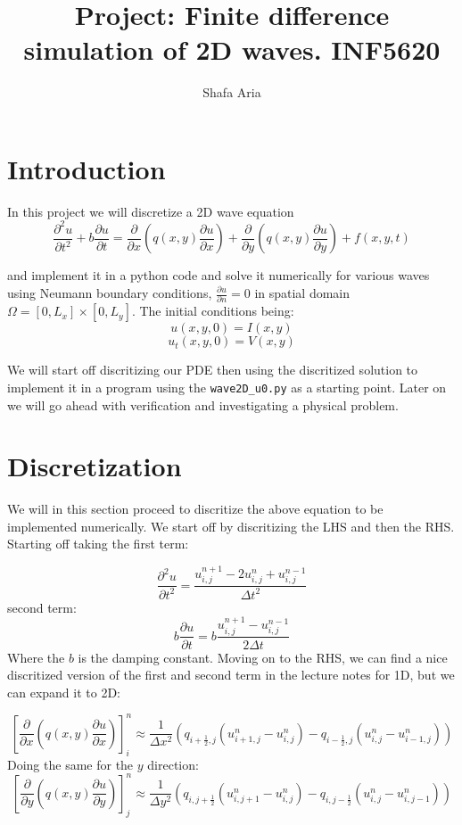 \documentclass{article}
\begin{document}
\title{Project: Finite difference simulation of 2D waves. INF5620}
\author{Shafa Aria}
\maketitle
 
\section{Introduction}
In this project we will discretize a 2D wave equation\\
$$\frac{\partial^2 u}{\partial t^2} + b\frac{\partial u}{\partial t} = \frac{\partial}{\partial x}\left(q(x,y)\frac{\partial u}{\partial x} \right) + \frac{\partial}{\partial y}\left(q(x,y)\frac{\partial u}{\partial y} \right) + f(x,y,t) $$


and implement it in a python code and solve it numerically for various waves using Neumann boundary conditions, $\frac{\partial u}{\partial n} = 0$ in spatial domain \newline $\Omega = [0,L_x] \times [0, L_y]$. The initial conditions being: 
$$u(x,y,0)=I(x,y)$$
$$u_t(x,y,0)=V(x,y)$$

We will start off discritizing our PDE then using the discritized solution to implement it in a program using the \texttt{wave2D\_u0.py} as a starting point. 
Later on we will go ahead with verification and investigating a physical problem.

\newpage

\section{Discretization}
We will in this section proceed to discritize the above equation to be implemented numerically. We start off by discritizing the LHS and then the RHS.
Starting off taking the first term:

$$\frac{\partial^2 u}{\partial t^2} = \frac{u^{n+1}_{i,j}-2u^{n}_{i,j}+u^{n-1}_{i,j}}{\Delta t^2}$$
second term:
$$b\frac{\partial u}{\partial t} = b\frac{u^{n+1}_{i,j}-u^{n-1}_{i,j}}{2\Delta t}$$
Where the $b$ is the damping constant. Moving on to the RHS, we can find a nice discritized version of the first and second term in the lecture notes for 1D, but we can expand it to 2D:

$$\left[\frac{\partial}{\partial x}\left(q(x,y)\frac{\partial u}{\partial x}\right)\right]^n_i \approx \frac{1}{\Delta x^2} \left(q_{i+\frac{1}{2},j} (u^{n}_{i+1,j} - u^{n}_{i,j})-q_{i-\frac{1}{2},j}(u^{n}_{i,j} - u^{n}_{i-1,j})\right) $$
Doing the same for the $y$ direction:
$$\left[\frac{\partial}{\partial y}\left(q(x,y)\frac{\partial u}{\partial y}\right)\right]^n_j \approx \frac{1}{\Delta y^2} \left(q_{i,j+\frac{1}{2}} (u^{n}_{i,j+1} - u^{n}_{i,j})-q_{i,j-\frac{1}{2}}(u^{n}_{i,j} - u^{n}_{i,j-1})\right) $$
\end{document}
